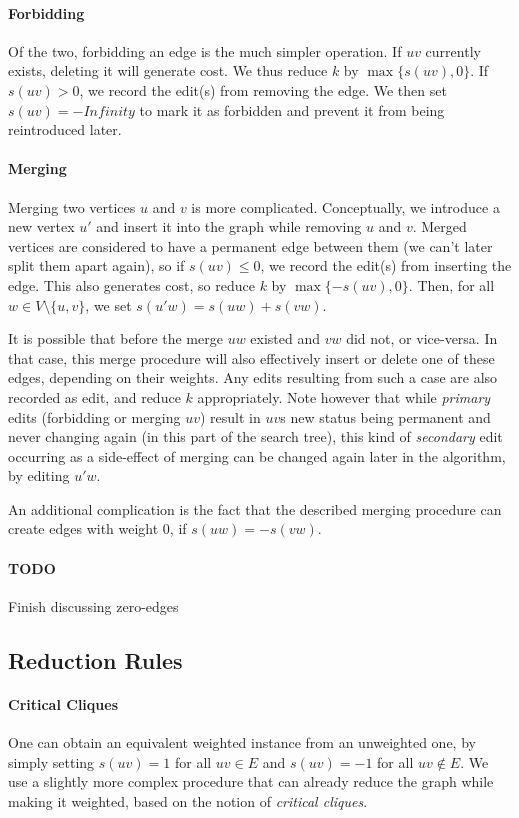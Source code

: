\documentclass{article}
\newcommand{\todo}[1]{\paragraph{TODO} #1}
\theoremstyle{definition}
\begin{document}
\paragraph{Forbidding} Of the two, forbidding an edge is the much simpler operation. If $uv$
currently exists, deleting it will generate cost. We thus reduce $k$ by $\max\{s(uv), 0\}$. If $s(uv)
> 0$, we record the edit(s) from removing the edge. We then set $s(uv) = -Infinity$ to mark it as
forbidden and prevent it from being reintroduced later.

\paragraph{Merging} Merging two vertices $u$ and $v$ is more complicated. Conceptually, we introduce
a new vertex $u'$ and insert it into the graph while removing $u$ and $v$. Merged vertices are
considered to have a permanent edge between them (we can't later split them apart again), so if
$s(uv) \leq 0$, we record the edit(s) from inserting the edge. This also generates cost, so reduce
$k$ by $\max\{-s(uv), 0\}$. Then, for all $w \in V \setminus \{u, v\}$, we set $s(u'w) = s(uw) +
s(vw)$.

It is possible that before the merge $uw$ existed and $vw$ did not, or vice-versa. In that case,
this merge procedure will also effectively insert or delete one of these edges, depending on their
weights. Any edits resulting from such a case are also recorded as edit, and reduce $k$
appropriately. Note however that while \emph{primary} edits (forbidding or merging $uv$) result in
$uv$s new status being permanent and never changing again (in this part of the search tree), this
kind of \emph{secondary} edit occurring as a side-effect of merging can be changed again later in
the algorithm, by editing $u'w$.

An additional complication is the fact that the described merging procedure can create edges with
weight 0, if $s(uw) = -s(vw)$.
\todo Finish discussing zero-edges

\subsection{Reduction Rules}

\paragraph{Critical Cliques} One can obtain an equivalent weighted instance from an unweighted one,
by simply setting $s(uv) = 1$ for all $uv \in E$ and $s(uv) = -1$ for all $uv \notin E$. We use a
slightly more complex procedure that can already reduce the graph while making it weighted, based on
the notion of \emph{critical cliques}.
\end{document}
